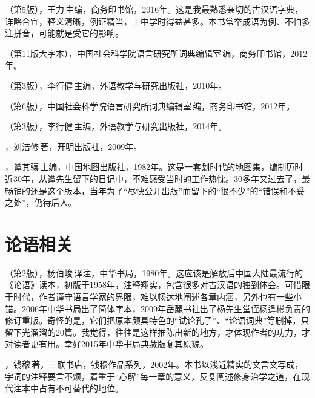 （第5版），王力\,主编，商务印书馆，2016年。这是我最熟悉亲切的古汉语字典，详略合宜，释义清晰，例证精当，上中学时得益甚多。本书常举成语为例、不怕多注拼音，可能就是受它的影响。

（第11版大字本），中国社会科学院语言研究所词典编辑室\,编，商务印书馆，2012年。

（第3版），李行健\,主编，外语教学与研究出版社，2010年。

（第6版），中国社会科学院语言研究所词典编辑室\,编，商务印书馆，2012年。

（第3版），李行健\,主编，外语教学与研究出版社，2014年。

，刘洁修\,著，开明出版社，2009年。

，谭其骧\,主编，中国地图出版社，1982年。这是一套划时代的地图集，编制历时近30年，从谭先生留下的日记中，不难感受当时的工作热忱。30多年又过去了，最畅销的还是这个版本，当年为了“尽快公开出版”而留下的“很不少”的“错误和不妥之处”，仍待后人。


\lypdfbookmark\section*{论语相关}

（第2版），杨伯峻\,译注，中华书局，1980年。这应该是解放后中国大陆最流行的《论语》读本，初版于1958年，注释翔实，包含很多对古汉语的独到体会。可惜限于时代，作者谨守语言学家的界限，难以畅达地阐述各章内涵，另外也有一些小错。2006年中华书局出了简体字本，2009年岳麓书社出了杨先生堂侄杨逢彬负责的修订重版。奇怪的是，它们把原本颇具特色的“试论孔子”、“论语词典”等删掉，只留下光溜溜的20篇。我觉得，往往是这样推陈出新的地方，才体现作者的功力，才对读者更有用。幸好2015年中华书局典藏版复其原貌。

，钱穆\,著，三联书店，钱穆作品系列，2002年。本书以浅近精实的文言文写成，字词的注释要言不烦，着重于“心解”每一章的意义，反复阐述修身治学之道，在现代注本中占有不可替代的地位。

